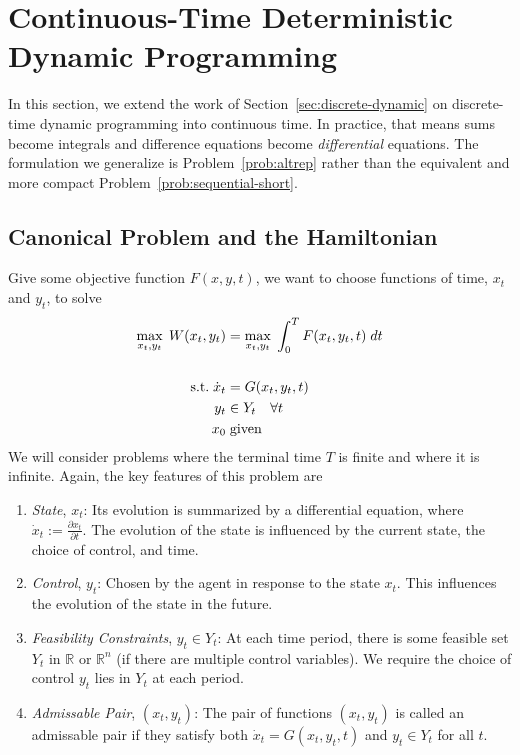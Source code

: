 \documentclass[12pt]{article}
\numberwithin{equation}{section} %
\theoremstyle{plain}
\theoremstyle{definition}
\theoremstyle{remark}
\newcommand{\R}{\mathbb{R}}
\newcommand{\Rn}{\mathbb{R}^n}
\newcommand{\Rk}{\mathbb{R}^n}
\begin{document}
\clearpage
\section{Continuous-Time Deterministic Dynamic Programming}
\label{sec:continuous-dynamic}

In this section, we extend the work of
Section~\ref{sec:discrete-dynamic} on discrete-time dynamic programming
into continuous time. In practice, that means sums become integrals and
difference equations become \emph{differential} equations.  The
formulation we generalize is Problem~\ref{prob:altrep} rather than the
equivalent and more compact Problem~\ref{prob:sequential-short}.

\subsection{Canonical Problem and the Hamiltonian}

Give some objective function $F(x,y,t)$, we want to choose functions
of time, $x_t$ and $y_t$, to solve
\begin{align}
  \max_{x_t,y_t} \; W(x_t,y_t) &=
  \max_{x_t,y_t} \; \int^{T}_{0} F(x_t,y_t,t) \; dt
  \label{prob:cts-dynamic} \\\notag\\
  \text{s.t.} \;
   \dot{x}_t &= G(x_t,y_t,t) \notag \\
   y_t &\in Y_t \quad \forall t\notag \\
   x_0  &\;\text{given} \notag
\end{align}
We will consider problems where the terminal time $T$ is finite and
where it is infinite.
Again, the key features of this problem are
\begin{enumerate}
  \item \emph{State}, $x_t$:
    Its evolution is summarized by a differential equation, where
    $\dot{x}_t := \frac{\partial x_t}{\partial t}$. The evolution of the
    state is influenced by the current state, the choice of control, and
    time.
  \item \emph{Control}, $y_t$: Chosen by the agent in response to the
    state $x_t$. This influences the evolution of the state in the
    future.
  \item \emph{Feasibility Constraints}, $y_t\in Y_t$: At each time
    period, there is some feasible set $Y_t$ in $\R$ or $\Rk$ (if there
    are multiple control variables). We require the choice of control
    $y_t$ lies in $Y_t$ at each period.
  \item \emph{Admissable Pair}, $(x_t,y_t)$: The pair of functions
    $(x_t,y_t)$ is called an admissable pair if they satisfy both
    $\dot{x}_t = G(x_t,y_t,t)$ and $y_t\in Y_t$ for all $t$.
\end{enumerate}
\end{document}
